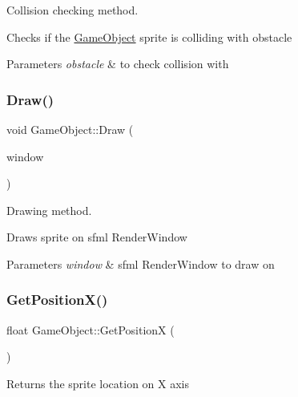 Collision checking method. 

Checks if the \mbox{\hyperlink{class_game_object}{Game\+Object}} sprite is colliding with obstacle 
\begin{DoxyParams}{Parameters}
{\em obstacle} & to check collision with \\
\hline
\end{DoxyParams}
\mbox{\label{class_game_object_a7ba982dd7315ab822c18dd9892112316}} 
\subsubsection{\texorpdfstring{Draw()}{Draw()}}
{\footnotesize\ttfamily void Game\+Object\+::\+Draw (\begin{DoxyParamCaption}\item[{sf\+::\+Render\+Window $\ast$}]{window }\end{DoxyParamCaption})}



Drawing method. 

Draws sprite on sfml Render\+Window 
\begin{DoxyParams}{Parameters}
{\em window} & sfml Render\+Window to draw on \\
\hline
\end{DoxyParams}
\mbox{\label{class_game_object_a274bf74e1658d845a0603be2972a63c4}} 
\subsubsection{\texorpdfstring{Get\+Position\+X()}{GetPositionX()}}
{\footnotesize\ttfamily float Game\+Object\+::\+Get\+PositionX (\begin{DoxyParamCaption}{ }\end{DoxyParamCaption})\hspace{0.3cm}{\ttfamily [inline]}}

Returns the sprite location on X axis \mbox{\label{class_game_object_abe7e418773edb98562033fcfdf191dd9}} 

